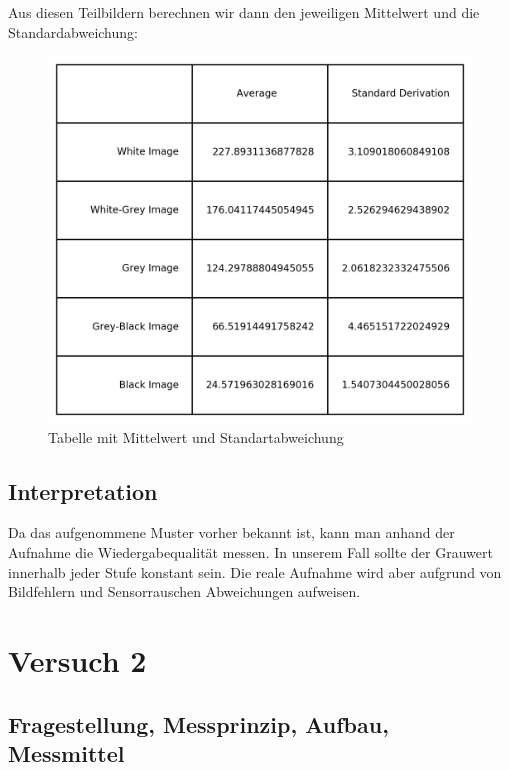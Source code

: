 \documentclass[12pt, oneside, a4paper, \docLanguage]{report}
\begin{document}
\pagebreak
\begin{flushleft}
Aus diesen Teilbildern berechnen wir dann den jeweiligen Mittelwert und die Standardabweichung:
\end{flushleft}

\begin{figure}[H]
\centering
\includegraphics[scale=1.3]{../table.png}
\caption{Tabelle mit Mittelwert und Standartabweichung}
\end{figure}
\pagebreak

\section{Interpretation}
\label{chap:VERSUCH_1_INTERPRETATION}
Da das aufgenommene Muster vorher bekannt ist, kann
man anhand der Aufnahme die Wiedergabequalität messen. In unserem Fall sollte der
Grauwert innerhalb jeder Stufe konstant sein. Die reale Aufnahme wird aber aufgrund von
Bildfehlern und Sensorrauschen Abweichungen aufweisen.


%
%
\chapter{Versuch 2}
\label{chap:VERSUCH_2}

\section{Fragestellung, Messprinzip, Aufbau, Messmittel}
\label{chap:VERSUCH_2_FRAGESTELLUNG}
\end{document}
